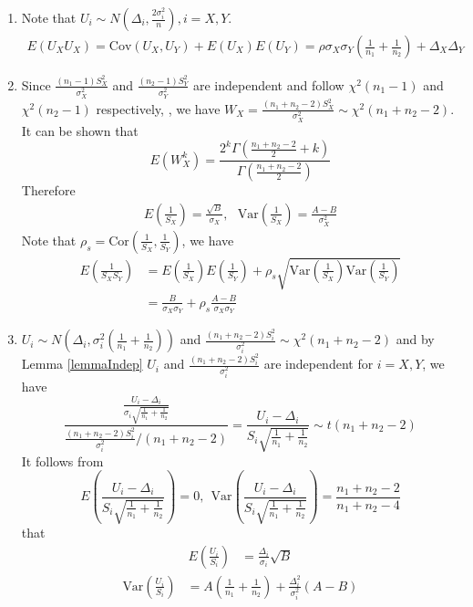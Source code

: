 \documentclass[12pt, a4paper]{article}
\newcommand{\cov}{\text{Cov}}
\newcommand{\var}{\text{Var}}
\begin{document}
	\begin{enumerate}
		\item Note that $U_i\sim N(\Delta_i, \frac{2\sigma_i^2}{n}),  i=X, Y$. 
		\begin{align}\label{eq1}
			E(U_XU_X)= \cov(U_X, U_Y) + E(U_X)E(U_Y) = \rho\sigma_X\sigma_Y\left(\frac{1}{n_1} + \frac{1}{n_2}\right) +
			\Delta_X\Delta_Y
		\end{align} 
		\item Since $\frac{(n_1-1)S_{X}^2}{\sigma_X^2}$ and $\frac{(n_2-1)S_{Y}^2}{\sigma_Y^2}$ are
		independent and follow $\chi^2(n_1-1)$ and $\chi^2(n_2 -1)$ respectively, , we have $W_{X}=\frac{(n_1 + n_2 -2)S_X^2}{\sigma_X^2}\sim
		\chi^2(n_1 + n_2-2)$. It can be shown that 
		\[E(W_{X}^k)= \frac{2^k\Gamma(\frac{n_1 + n_2 -2}{2}+k)}{\Gamma(\frac{n_1 + n_2 -2}{2})}\] 
		Therefore 
		\begin{equation}
		\begin{aligned}
		E\left(\frac{1}{S_X}\right) =
	 \frac{\sqrt{B}}{\sigma_X},		~~~\var\left(\frac{1}{S_X}\right) = \frac{A-B}{\sigma_X^2}
		\end{aligned}
		\end{equation}
			Note that $\rho_s = \text{Cor}(\frac{1}{S_X}, \frac{1}{S_Y})$, we have 
			\begin{equation}\label{eq2}
			\begin{aligned}
			E(\frac{1}{S_XS_Y})  &= E(\frac{1}{S_X})E(\frac{1}{S_Y}) + \rho_s
			\sqrt{\var(\frac{1}{S_X})\var(\frac{1}{S_Y})} \\
			& = \frac{B}{\sigma_X\sigma_Y} + \rho_s
			\frac{A-B}{\sigma_X\sigma_Y}
			\end{aligned}
			\end{equation}
	
		\item $U_i\sim N\left(\Delta_i, \sigma_i^2(\frac{1}{n_1} + \frac{1}{n_2})\right)$ and $\frac{(n_1 + n_2 -2)S_i^2}{\sigma_i^2} \sim
		\chi^2(n_1 + n_2-2)$ and by Lemma \ref{lemmaIndep}  $U_i$ and $\frac{(n_1 + n_2 -2)S_i^2}{\sigma_i^2}$ are independent for $i = X, Y$, we have 
		\begin{equation}
			\frac{\frac{U_i-\Delta_i}{\sigma_i\sqrt{\frac{1}{n_1} + \frac{1}{n_2}}}}{\frac{(n_1 + n_2-2)S_i^2}{\sigma_i^2}/(n_1 + n_2 -2)}  =
			\frac{U_i-\Delta_i}{S_i\sqrt{\frac{1}{n_1 } + \frac{1}{n_2}}}\sim t(n_1 + n_2-2)
		\end{equation}	
		It follows from 
		\begin{equation}
			E\left(\frac{U_i-\Delta_i}{S_i\sqrt{\frac{1}{n_1} + \frac{1}{n_2}}}\right)=0, ~~ \text{Var}\left(\frac{U_i-\Delta_i}{S_i\sqrt{\frac{1}{n_1} + \frac{1}{n_2}}}\right) = \frac{n_1 + n_2-2}{n_1 + n_2-4}
		\end{equation}
	 that
		\begin{align}\label{eq3}
			E\left(\frac{U_i}{S_i}\right) &= \frac{\Delta_i}{\sigma_i}\sqrt{B}
		\end{align}
		\begin{align}\label{eq4}
			\text{Var}\left(\frac{U_i}{S_i}\right)&=A\left(\frac{1}{n_1} + \frac{1}{n_2}\right) + \frac{\Delta_i^2}{\sigma_i^2}(A-B)
		\end{align}
	\end{enumerate}
\end{document}
